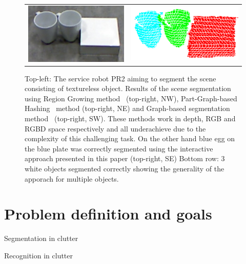 \begin{figure}[ht]
\begin{tabular}{cccc}
\multicolumn{2}{c}{\includegraphics[width=0.45\columnwidth]{figures/3objects/after_push.jpg}}
& \multicolumn{2}{c}{\includegraphics[width=0.45\columnwidth]{figures/3objects/segmented.png}}
\end{tabular}
\caption{Top-left: The service robot PR2 aiming to segment the scene
  consisting of textureless object. Results  of  the   scene segmentation
  using Region  Growing  method~\cite{RGBRegionGrowing} (top-right, NW), Part-Graph-based 
  Hashing~\cite{marton12SC} method (top-right, NE) and Graph-based  
  segmentation method~\cite{Felzenszwalb}   (top-right, SW). These methods work in depth, RGB and RGBD 
  space respectively and all underachieve due to the complexity of this challenging task. 
  On the other hand blue egg on the blue plate was correctly segmented using the interactive approach presented in this paper (top-right, SE)
  Bottom row: 3 white objects segmented correctly showing the generality of the apporach for multiple objects.}
\label{fig:tracking_dists}
\end{figure}

























\section{Problem definition and goals}
\item Segmentation in clutter
\item Recognition in clutter

